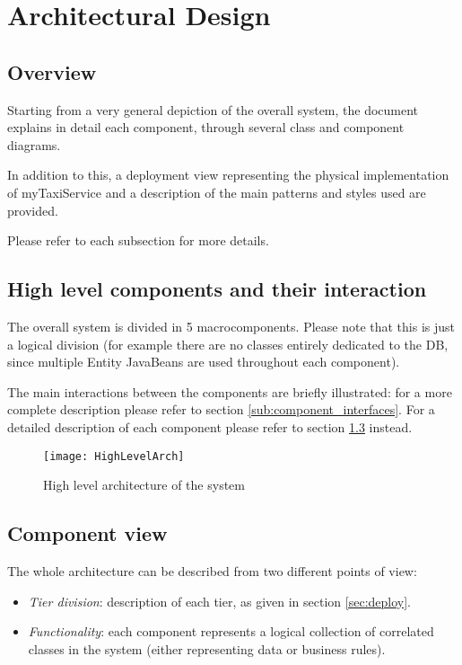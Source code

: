 \pagebreak
\section{Architectural Design}
 
\subsection{Overview}
Starting from a very general depiction of the overall system, the document 
explains in detail each component, through several class and component diagrams.

In addition to this, a deployment view representing the physical implementation 
of myTaxiService and a description of the main patterns and styles used are provided. 

Please refer to each subsection for more details.

\pagebreak

\subsection{High level components and their interaction}
The overall system is divided in 5 macrocomponents. 
Please note that this is just a logical division (for example there are no 
classes entirely dedicated to the DB, since multiple Entity JavaBeans are used 
throughout each component). 

The main interactions between the components are briefly illustrated: for a 
more complete description please refer to section \ref{sub:component_interfaces}. 
For a detailed description of each component please refer to section \ref{sub:component_view} instead.

\begin{figure}[H]
    \centering
    \texttt{[image: HighLevelArch]}
    \caption{High level architecture of the system}
    \label{fig:hlarch}
\end{figure}

\pagebreak
\subsection{Component view}
\label{sub:component_view}

The whole architecture can be described from two different points of view: 
\begin{itemize}
	\item \emph{Tier division}: description of each tier, as given in section \ref{sec:deploy}.
	\item \emph{Functionality}: each component represents a logical collection of correlated classes in the system (either representing data or business rules).
\end{itemize}

